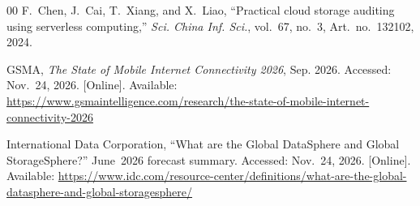 \documentclass[lettersize,journal]{IEEEtran}
\begin{document}
\begin{thebibliography}{00}
F.~Chen, J.~Cai, T.~Xiang, and X.~Liao,
``Practical cloud storage auditing using serverless computing,''
\emph{Sci. China Inf. Sci.}, vol.~67, no.~3, Art.~no.~132102, 2024.


GSMA,
\emph{The State of Mobile Internet Connectivity 2026}, Sep. 2026. Accessed: Nov.~24, 2026. [Online]. Available: \url{https://www.gsmaintelligence.com/research/the-state-of-mobile-internet-connectivity-2026}

International Data Corporation,
``What are the Global DataSphere and Global StorageSphere?'' June~2026 forecast summary. Accessed: Nov.~24, 2026. [Online]. Available: \url{https://www.idc.com/resource-center/definitions/what-are-the-global-datasphere-and-global-storagesphere/}

\end{thebibliography}
\end{document}
